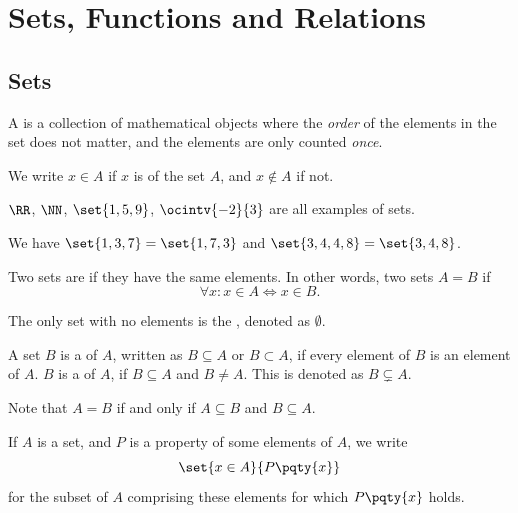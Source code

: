 \section{Sets, Functions and Relations}
\label{sec:sets-functions-relations}

\subsection{Sets}
\label{sec:sets}

\begin{definition}
    A  is a collection of mathematical objects where the \emph{order} of the elements in the set does not matter, and the elements are only counted \emph{once}.

    We write \(x \in A\) if \(x\) is  of the set \(A\), and \(x \notin A\) if not.
\end{definition}

\begin{example}
    \(\RR\), \(\NN\), \(\set{1, 5, 9}\), \(\ocintv{-2}{3}\) are all examples of sets.
    
    We have \(\set{1, 3, 7} = \set{1, 7, 3}\) and \(\set{3, 4, 4, 8} = \set{3, 4, 8}\).
\end{example}

\begin{definition}
    Two sets are  if they have the same elements. In other words, two sets \(A = B\) if
    \[
        \forall x: x \in A \iff x \in B.
    \]
\end{definition}

\begin{definition}
    The only set with no elements is the , denoted as \(\emptyset\).
\end{definition}

\begin{definition}
    A set \(B\) is a  of \(A\), written as \(B \subseteq A\) or \(B \subset A\), if every element of \(B\) is an element of \(A\). \(B\) is a  of \(A\), if \(B \subseteq A\) and \(B \neq A\). This is denoted as \(B \subsetneq A\).
\end{definition}

Note that \(A = B\) if and only if \(A \subseteq B\) and \(B \subseteq A\).

\begin{definition}
    If \(A\) is a set, and \(P\) is a property of some elements of \(A\), we write
    \[
        \set{x \in A}{P\pqty{x}}
    \]
    for the subset of \(A\) comprising these elements for which \(P\pqty{x}\) holds.
\end{definition}


